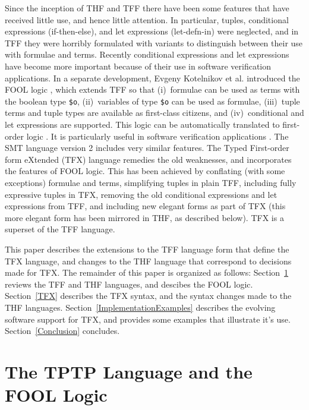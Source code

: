 \documentclass{easychair}
\begin{document}
Since the inception of THF and TFF there have been some features that have 
received little use, and hence little attention. 
In particular, tuples, conditional expressions (if-then-else), and let 
expressions (let-defn-in) were neglected, and in TFF they were horribly 
formulated with variants to distinguish between their use with formulae and 
terms. 
Recently conditional expressions and let expressions have become more 
important because of their use in software verification applications.
In a separate development, Evgeny Kotelnikov et al. introduced the FOOL logic
\cite{KKV15}, which extends TFF so that (i)~formulae can be used as terms 
with the boolean type {\tt \$o}, (ii)~variables of type {\tt \$o} can be used 
as formulae, (iii)~tuple terms and tuple types are available as first-class 
citizens, and (iv)~conditional and let expressions are supported. 
This logic can be automatically translated to first-order logic 
\cite{KK+16-GCAI}.
It is particularly useful in software verification applications \cite{KKV18}.
The SMT language version 2 \cite{BST10} includes very similar features.
The Typed First-order form eXtended (TFX) language remedies the
old weaknesses, and incorporates the features of FOOL logic.
This has been achieved by conflating (with some exceptions) formulae and 
terms, simplifying tuples in plain TFF, including fully expressive tuples in 
TFX, removing the old conditional expressions and let expressions from 
TFF, and including new elegant forms as part of TFX
(this more elegant form has been mirrored in THF, as described below).
TFX is a superset of the TFF language. 

This paper describes the extensions to the TFF language form that define the 
TFX language, and changes to the THF language that correspond to decisions 
made for TFX.
The remainder of this paper is organized as follows:
Section~\ref{TPTPFOOL} reviews the TFF and THF languages, and
descibes the FOOL logic.
Section~\ref{TFX} describes the TFX syntax, and the syntax changes made to
the THF languages.
Section~\ref{ImplementationExamples} describes the evolving software 
support for TFX, and provides some examples that illustrate it's use.
Section~\ref{Conclusion} concludes.

\section{The TPTP Language and the FOOL Logic}
\label{TPTPFOOL}
\end{document}
